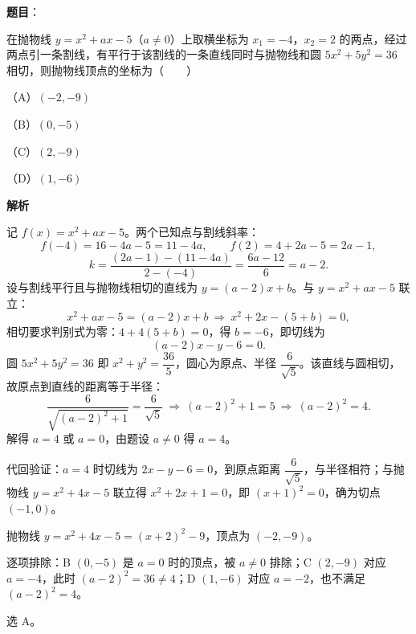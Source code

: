 \begin{answer}

\textbf{题目}：

在抛物线 $y=x^2+ax-5$（$a\neq0$）上取横坐标为 $x_1=-4$，$x_2=2$ 的两点，经过两点引一条割线，有平行于该割线的一条直线同时与抛物线和圆 $5x^2+5y^2=36$ 相切，则抛物线顶点的坐标为\mbox{（　　）}

（A）$(-2,-9)$

（B）$(0,-5)$

（C）$(2,-9)$

（D）$(1,-6)$

\textbf{解析}

记 $f(x)=x^2+ax-5$。两个已知点与割线斜率：
\nopagebreak[4]
\[
f(-4)=16-4a-5=11-4a,\qquad f(2)=4+2a-5=2a-1,
\]
\nopagebreak[4]
\[
k=\frac{(2a-1)-(11-4a)}{2-(-4)}=\frac{6a-12}{6}=a-2.
\]
设与割线平行且与抛物线相切的直线为 $y=(a-2)x+b$。与 $y=x^2+ax-5$ 联立：
\nopagebreak[4]
\[
x^2+ax-5=(a-2)x+b\ \Longrightarrow\ x^2+2x-(5+b)=0,
\]
相切要求判别式为零：$4+4(5+b)=0$，得 $b=-6$，即切线为
\nopagebreak[4]
\[
(a-2)x-y-6=0.
\]
圆 $5x^2+5y^2=36$ 即 $x^2+y^2=\dfrac{36}{5}$，圆心为原点、半径 $\dfrac{6}{\sqrt5}$。该直线与圆相切，故原点到直线的距离等于半径：
\nopagebreak[4]
\[
\frac{6}{\sqrt{(a-2)^2+1}}=\frac{6}{\sqrt5}\ \Longrightarrow\ (a-2)^2+1=5\ \Longrightarrow\ (a-2)^2=4.
\]
解得 $a=4$ 或 $a=0$，由题设 $a\neq0$ 得 $a=4$。

代回验证：$a=4$ 时切线为 $2x-y-6=0$，到原点距离 $\dfrac{6}{\sqrt5}$，与半径相符；与抛物线 $y=x^2+4x-5$ 联立得 $x^2+2x+1=0$，即 $(x+1)^2=0$，确为切点 $(-1,0)$。

抛物线 $y=x^2+4x-5=(x+2)^2-9$，顶点为 $(-2,-9)$。

逐项排除：B $(0,-5)$ 是 $a=0$ 时的顶点，被 $a\neq0$ 排除；C $(2,-9)$ 对应 $a=-4$，此时 $(a-2)^2=36\neq4$；D $(1,-6)$ 对应 $a=-2$，也不满足 $(a-2)^2=4$。

选 A。


\end{answer}
